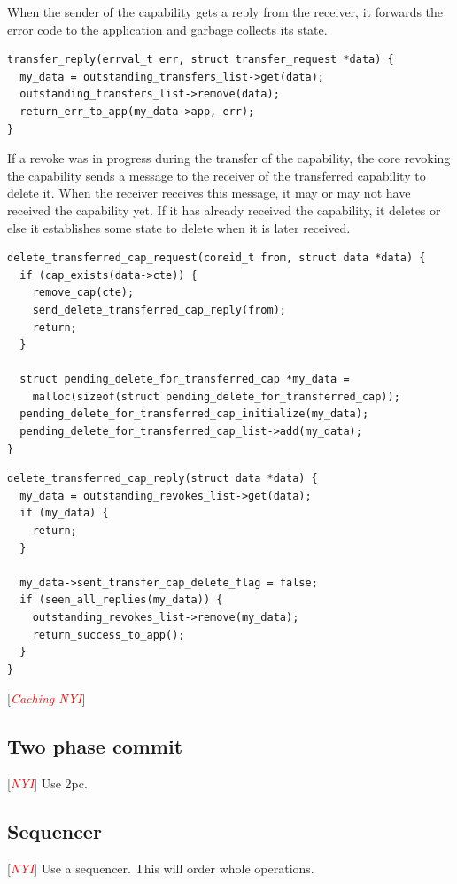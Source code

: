 \documentclass[a4paper,twoside]{report} %
\newcommand{\note}[1]{[\textcolor{red}{\textit{#1}}]}
\begin{document}
When the sender of the capability gets a reply from the receiver, it
forwards the error code to the application and garbage collects its
state.

\begin{verbatim}
transfer_reply(errval_t err, struct transfer_request *data) {
  my_data = outstanding_transfers_list->get(data);
  outstanding_transfers_list->remove(data);
  return_err_to_app(my_data->app, err);
}
\end{verbatim}

If a revoke was in progress during the transfer of the capability, the
core revoking the capability sends a message to the receiver of the
transferred capability to delete it. When the receiver receives this
message, it may or may not have received the capability yet. If it has
already received the capability, it deletes or else it establishes
some state to delete when it is later received.

\begin{verbatim}
delete_transferred_cap_request(coreid_t from, struct data *data) {
  if (cap_exists(data->cte)) {
    remove_cap(cte);
    send_delete_transferred_cap_reply(from);
    return;
  }

  struct pending_delete_for_transferred_cap *my_data =
    malloc(sizeof(struct pending_delete_for_transferred_cap));
  pending_delete_for_transferred_cap_initialize(my_data);
  pending_delete_for_transferred_cap_list->add(my_data);
}
\end{verbatim}

\begin{verbatim}
delete_transferred_cap_reply(struct data *data) {
  my_data = outstanding_revokes_list->get(data);
  if (my_data) {
    return;
  }

  my_data->sent_transfer_cap_delete_flag = false;
  if (seen_all_replies(my_data)) {
    outstanding_revokes_list->remove(my_data);
    return_success_to_app();
  }
}
\end{verbatim}

\note{Caching NYI}

\subsection{Two phase commit}
\note{NYI}
Use 2pc.

\subsection{Sequencer}
\note{NYI}
Use a sequencer. This will order whole operations.
\end{document}

